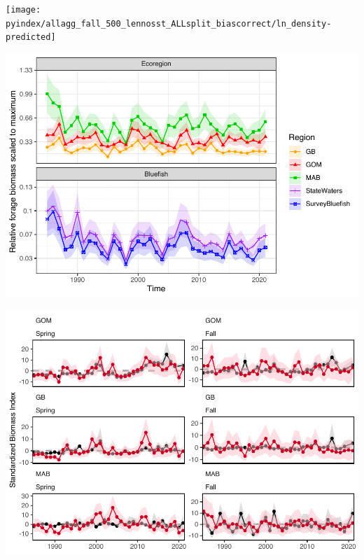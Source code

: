 \documentclass[
]{article}
\let\origfigure\figure
\let\endorigfigure\endfigure
\renewenvironment{figure}[1][2] {
    \expandafter\origfigure\expandafter[H]
} {
    \endorigfigure
}
\begin{document}
\begin{figure}
\texttt{[image: pyindex/allagg\_fall\_500\_lennosst\_ALLsplit\_biascorrect/ln\_density-predicted]} \caption{Yearly maps of VAST model estimated forage fish density for Fall (months 7-12).}\label{fig:falldens}
\end{figure}

\begin{figure}
\centering
\includegraphics{Bluefish_forageindex_CJFAS_files/figure-latex/fallall-1.pdf}
\caption{\label{fig:fallall}Fall forage indices scaled to the maximum value (Mid Atlantic, 1985) for Ecoregions: Georges Bank (GB), Gulf of Maine (GOM), Mid Atlantic Bight (MAB), and Bluefish assessment index areas: state waters within 3 miles of shore (StateWaters), and bottom trawl survey index strata (SurveyBluefish).}
\end{figure}

\begin{figure}
\centering
\includegraphics{Bluefish_forageindex_CJFAS_files/figure-latex/tscomp-1.pdf}
\caption{\label{fig:tscomp}Time series of VAST stomach contents based forage index (red) compared with survey based index (black) by season and region (GOM = Gulf of Maine, GB = Georges Bank, MAB = Mid Atlantic Bight).}
\end{figure}
\end{document}
